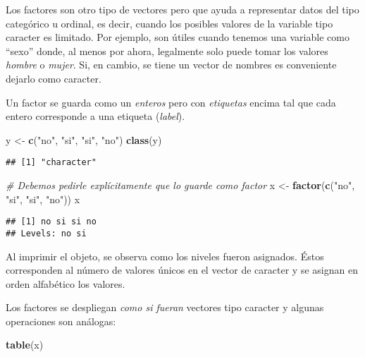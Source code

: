 \documentclass[]{article}
\newenvironment{Shaded}{\begin{snugshade}}{\end{snugshade}}
\newcommand{\KeywordTok}[1]{\textcolor[rgb]{0.13,0.29,0.53}{\textbf{#1}}}
\newcommand{\StringTok}[1]{\textcolor[rgb]{0.31,0.60,0.02}{#1}}
\newcommand{\CommentTok}[1]{\textcolor[rgb]{0.56,0.35,0.01}{\textit{#1}}}
\newcommand{\NormalTok}[1]{#1}
\begin{document}
Los factores son otro tipo de vectores pero que ayuda a representar
datos del tipo categórico u ordinal, es decir, cuando los posibles
valores de la variable tipo caracter es limitado. Por ejemplo, son
útiles cuando tenemos una variable como ``sexo'' donde, al menos por
ahora, legalmente solo puede tomar los valores \emph{hombre} o
\emph{mujer}. Si, en cambio, se tiene un vector de nombres es
conveniente dejarlo como caracter.

Un factor se guarda como un \emph{enteros} pero con \emph{etiquetas}
encima tal que cada entero corresponde a una etiqueta (\emph{label}).

\begin{Shaded}
\begin{Highlighting}[]
\NormalTok{y <-}\StringTok{ }\KeywordTok{c}\NormalTok{(}\StringTok{"no"}\NormalTok{, }\StringTok{"si"}\NormalTok{, }\StringTok{"si"}\NormalTok{, }\StringTok{"no"}\NormalTok{)}
\KeywordTok{class}\NormalTok{(y)}
\end{Highlighting}
\end{Shaded}

\begin{verbatim}
## [1] "character"
\end{verbatim}

\begin{Shaded}
\begin{Highlighting}[]
\CommentTok{# Debemos pedirle explícitamente que lo guarde como factor}
\NormalTok{x <-}\StringTok{ }\KeywordTok{factor}\NormalTok{(}\KeywordTok{c}\NormalTok{(}\StringTok{"no"}\NormalTok{, }\StringTok{"si"}\NormalTok{, }\StringTok{"si"}\NormalTok{, }\StringTok{"no"}\NormalTok{))}
\NormalTok{x}
\end{Highlighting}
\end{Shaded}

\begin{verbatim}
## [1] no si si no
## Levels: no si
\end{verbatim}

Al imprimir el objeto, se observa como los niveles fueron asignados.
Éstos corresponden al número de valores únicos en el vector de caracter
y se asignan en orden alfabético los valores.

Los factores se despliegan \emph{como si fueran} vectores tipo caracter
y algunas operaciones son análogas:

\begin{Shaded}
\begin{Highlighting}[]
\KeywordTok{table}\NormalTok{(x)}
\end{Highlighting}
\end{Shaded}
\end{document}

